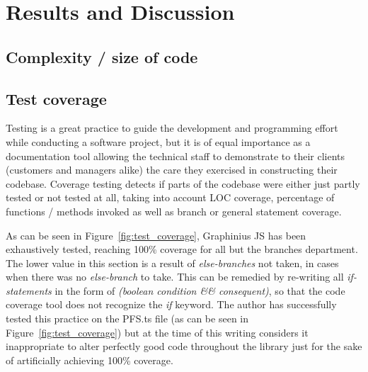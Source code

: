 \chapter{Results and Discussion}
\label{ch:results_discussion}


\section{Complexity / size of code}
\label{sect:complexity}


\section{Test coverage}
\label{sect:test_coverage}

Testing is a great practice to guide the development and programming effort while conducting a software project, but it is of equal importance as a documentation tool allowing the technical staff to demonstrate to their clients (customers and managers alike) the care they exercised in constructing their codebase. Coverage testing detects if parts of the codebase were either just partly tested or not tested at all, taking into account LOC coverage, percentage of functions / methods invoked as well as branch or general statement coverage.

As can be seen in Figure~\ref{fig:test_coverage}, Graphinius JS has been exhaustively tested, reaching 100\% coverage for all but the branches department. The lower value in this section is a result of \textit{else-branches} not taken, in cases when there was no \textit{else-branch} to take. This can be remedied by re-writing all \textit{if-statements} in the form of \textit{(boolean condition \&\& consequent)}, so that the code coverage tool does not recognize the \textit{if} keyword. The author has successfully tested this practice on the PFS.ts file (as can be seen in Figure~\ref{fig:test_coverage}) but at the time of this writing considers it inappropriate to alter perfectly good code throughout the library just for the sake of artificially achieving 100\% coverage.

